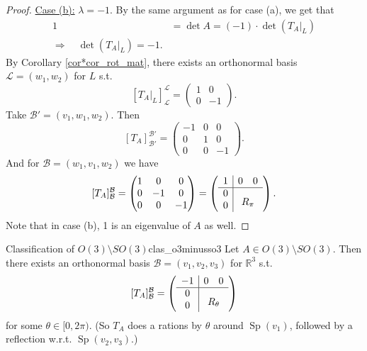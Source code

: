 \begin{proof}
	\underline{Case (b):} $\lambda = -1$. By the same argument as for case (a), we get that
	\begin{align*}
		1 &= \det A = (-1)\cdot \det (T_A|_{L})\\
		\Longrightarrow \quad \det(T_A|_{L}) = -1.
	\end{align*}
	By Corollary \ref{cor*cor_rot_mat}, there exists an orthonormal basis $\mathcal{L} = (w_1, w_2)$ for $L$ s.t.
	\[
		[T_A|_{L}]^{\mathcal{L}}_{\mathcal{L}} = \begin{pmatrix}
			1 & 0\\
			0 & -1
		\end{pmatrix}.
	\]
	Take $\mathcal{B}' = (v_1, w_1, w_2)$. Then
	\[
		[T_A]^{\mathcal{B}'}_{\mathcal{B}'} = \begin{pmatrix}
			-1 & 0 & 0\\
			0 & 1 & 0\\
			0 & 0 & -1
		\end{pmatrix}.
	\]
	And for $\mathcal{B} = (w_1, v_1, w_2)$ we have
	\[
		[T_A]^{\mathcal{B}}_{\mathcal{B}} = 
		\begin{pmatrix}
			1 & 0 & 0\\
			0 & -1 & 0\\
			0 & 0 & -1
		\end{pmatrix}
		=
		\left(
		\begin{array}{c|cc}
			1 & 0 & 0 \\
			\hline
			0 & \multicolumn{2}{c}{\smash{\lower2ex\hbox{$R_\pi$}}} \\
			0 & & 
		\end{array}
		\right).
	\]
	Note that in case (b), 1 is an eigenvalue of $A$ as well. \qedhere
\end{proof}

\begin{proposition}{Classification of $O(3) \setminus SO(3)$}{clas_o3minusso3}
	Let $A \in O(3)\setminus SO(3)$. Then there exists an orthonormal basis $\mathcal{B} = (v_1, v_2, v_3)$ for $\mathbb{R}^3$ s.t.
	\[
		[T_A]^{\mathcal{B}}_{\mathcal{B}}
		=
		\left(
		\begin{array}{c|cc}
			-1 & 0 & 0 \\
			\hline
			0 & \multicolumn{2}{c}{\smash{\lower2ex\hbox{$R_\theta$}}} \\
			0 & & 
		\end{array}
		\right)
	\]
	for some $\theta \in [0, 2\pi)$. (So $T_A$ does a rations by $\theta$ around $\operatorname{Sp}(v_1)$, followed by a reflection w.r.t. $\operatorname{Sp}(v_2, v_3)$.)
\end{proposition}














